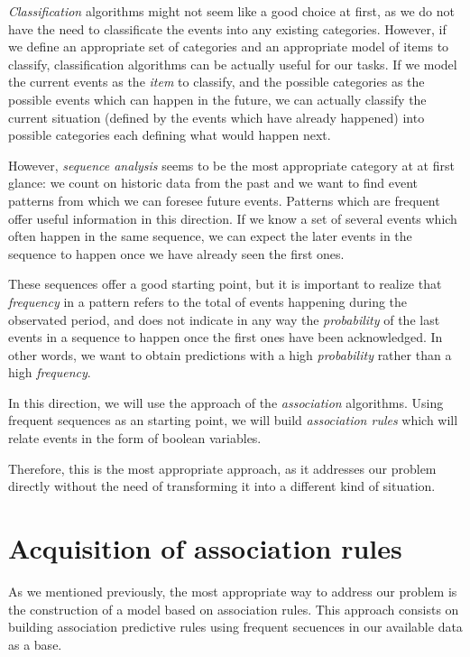 \emph{Classification} algorithms might not seem like a good choice at first, as we do not have the need to classificate the events into any existing categories. However, if we define an appropriate set of categories and an appropriate model of items to classify, classification algorithms can be actually useful for our tasks. If we model the current events as the \emph{item} to classify, and the possible categories as the possible events which can happen in the future, we can actually classify the current situation (defined by the events which have already happened) into possible categories each defining what would happen next.

However, \emph{sequence analysis} seems to be the most appropriate category at at first glance: we count on historic data from the past and we want to find event patterns from which we can foresee future events. Patterns which are frequent offer useful information in this direction. If we know a set of several events which often happen in the same sequence, we can expect the later events in the sequence to happen once we have already seen the first ones.

These sequences offer a good starting point, but it is important to realize that \emph{frequency} in a pattern refers to the total of events happening during the observated period, and does not indicate in any way the \emph{probability} of the last events in a sequence to happen once the first ones have been acknowledged. In other words, we want to obtain predictions with a high \emph{probability} rather than a high \emph{frequency}.

In this direction, we will use the approach of the \emph{association} algorithms. Using frequent sequences as an starting point, we will build \emph{association rules} which will relate events in the form of boolean variables.

Therefore, this is the most appropriate approach, as it addresses our problem directly without the need of transforming it into a different kind of situation.

\section{Acquisition of association rules}
\label{sec:rule_model}
As we mentioned previously, the most appropriate way to address our problem is the construction of a model based on association rules. This approach consists on building association predictive rules using frequent secuences in our available data as a base.

